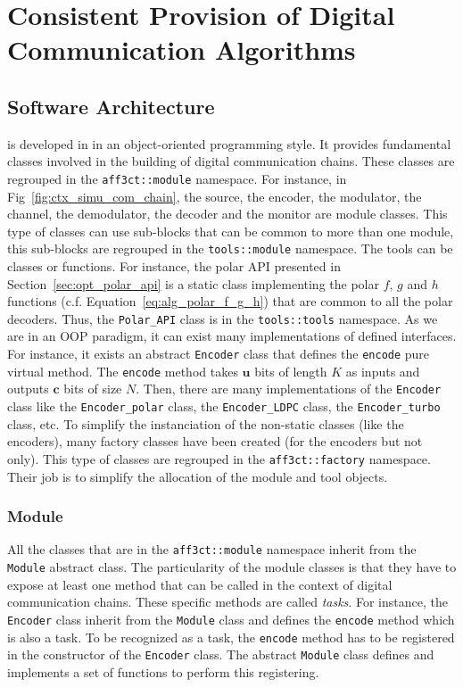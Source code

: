 \section{Consistent Provision of Digital Communication Algorithms}

\subsection{Software Architecture}
\label{sec:aff3ct_archi}

\AFFECT is developed in \Cxx in an object-oriented programming style. It
provides fundamental classes involved in the building of digital communication
chains. These classes are regrouped in the \verb|aff3ct::module| namespace. For
instance, in Fig~\ref{fig:ctx_simu_com_chain}, the source, the encoder, the
modulator, the channel, the demodulator, the decoder and the monitor are module
classes. This type of classes can use sub-blocks that can be common to more than
one module, this sub-blocks are regrouped in the \verb|tools::module| namespace.
The tools can be classes or functions. For instance, the polar API presented in
Section~\ref{sec:opt_polar_api} is a static class implementing the polar $f$,
$g$ and $h$ functions (c.f. Equation~\ref{eq:alg_polar_f_g_h}) that are common
to all the polar decoders. Thus, the \verb|Polar_API| class is in the
\verb|tools::tools| namespace. As we are in an OOP paradigm, it can exist many
implementations of defined interfaces. For instance, it exists an abstract
\verb|Encoder| class that defines the \verb|encode| pure virtual method. The
\verb|encode| method takes $\bm{u}$ bits of length $K$ as inputs and outputs
$\bm{c}$ bits of size $N$. Then, there are many implementations of the
\verb|Encoder| class like the \verb|Encoder_polar| class, the
\verb|Encoder_LDPC| class, the \verb|Encoder_turbo| class, etc. To simplify the
instanciation of the non-static classes (like the encoders), many factory
classes have been created (for the encoders but not only). This type of classes
are regrouped in the \verb|aff3ct::factory| namespace. Their job is to simplify
the allocation of the module and tool objects.

\subsubsection{Module}

All the classes that are in the \verb|aff3ct::module| namespace inherit from the
\verb|Module| abstract class. The particularity of the module classes is that
they have to expose at least one method that can be called in the context of
digital communication chains. These specific methods are called \emph{tasks}.
For instance, the \verb|Encoder| class inherit from the \verb|Module| class and
defines the \verb|encode| method which is also a task. To be recognized as a
task, the \verb|encode| method has to be registered in the constructor of the
\verb|Encoder| class. The abstract \verb|Module| class defines and implements a
set of functions to perform this registering.


